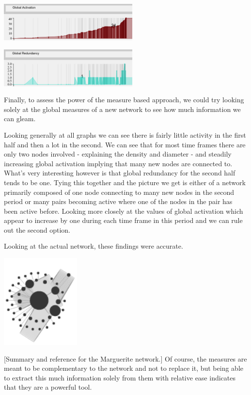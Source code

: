 \begin{multicols}{2}
\begin{center}
\end{center}
\begin{center}
\includegraphics[trim={0 0 0 0}, width=70mm]{./Figures/margueriteGlobalActivation.png}
\end{center}
\begin{center}
\includegraphics[trim={0 0 0 0}, width=70mm]{./Figures/margueriteGlobalRedundancy.png}
\end{center}
\columnbreak
[Reference]
Finally, to assess the power of the measure based approach, we could try looking solely at the global measures of a new network to see how much information we can gleam. 

Looking generally at all graphs we can see there is fairly little activity in the first half and then a lot in the second. We can see that for most time frames there are only two nodes involved - explaining the density and diameter - and steadily increasing global activation implying that many new nodes are connected to. What's very interesting however is that global redundancy for the second half tends to be one. Tying this together and the picture we get is either of a network primarily composed of one node connecting to many new nodes in the second period or many pairs becoming active where one of the nodes in the pair has been active before. Looking more closely at the values of global activation which appear to increase by one during each time frame in this period and we can rule out the second option.
\end{multicols}

Looking at the actual network, these findings were accurate. 
\begin{center}
\includegraphics[trim={0 0 0 0}, width=40mm]{./Figures/margueriteNetwork.png}
\end{center}
[Summary and reference for the Marguerite network.]
Of course, the measures are meant to be complementary to the network and not to replace it, but being able to extract this much information solely from them with relative ease indicates that they are a powerful tool.



